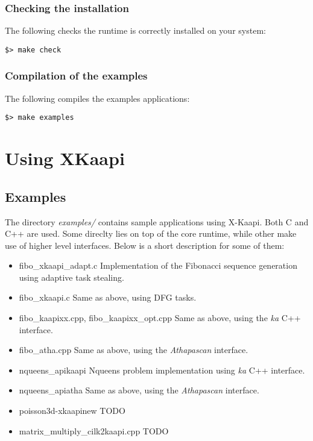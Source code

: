\documentclass{article}
\newcommand{\kaapi}{\textsc{X}-Kaapi\xspace}
\begin{document}
\subsubsection{Checking the installation}
The following checks the runtime is correctly installed on your system:
\begin{verbatim}
$> make check
\end{verbatim}

\subsubsection{Compilation of the examples}
The following compiles the examples applications:
\begin{verbatim}
$> make examples
\end{verbatim}

\section{Using XKaapi}

\subsection{Examples}
The directory \textit{examples/} contains sample applications using \kaapi.
Both C and C++ are used. Some direclty lies on top of the core runtime,
while other make use of higher level interfaces. Below is a short
description for some of them:
\begin{itemize}
\item fibo\_xkaapi\_adapt.c\newline
Implementation of the Fibonacci sequence generation using adaptive
task stealing.
\item fibo\_xkaapi.c\newline
Same as above, using DFG tasks.
\item fibo\_kaapixx.cpp, fibo\_kaapixx\_opt.cpp\newline
Same as above, using the \textit{ka} C++ interface.
\item fibo\_atha.cpp\newline
Same as above, using the \textit{Athapascan} interface.
\item nqueens\_apikaapi\newline
Nqueens problem implementation using \textit{ka} C++ interface.
\item nqueens\_apiatha\newline
Same as above, using the \textit{Athapascan} interface.
\item poisson3d-xkaapinew\newline
TODO
\item matrix\_multiply\_cilk2kaapi.cpp\newline
TODO
\end{itemize}
\end{document}
